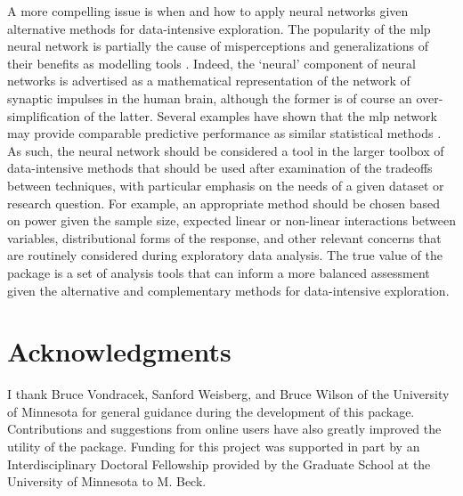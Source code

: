\documentclass[article,shortnames]{jss}\usepackage[]{graphicx}\usepackage[]{color}
\begin{document}
A more compelling issue is when and how to apply neural networks given alternative methods for data-intensive exploration.  The popularity of the \ac{mlp} neural network is partially the cause of misperceptions and generalizations of their benefits as modelling tools \citep{Burke97}. Indeed, the `neural' component of neural networks is advertised as a mathematical representation of the network of synaptic impulses in the human brain, although the former is of course an over-simplification of the latter.  Several examples have shown that the \ac{mlp} network may provide comparable predictive performance as similar statistical methods \citep{Feng02,Razi05,Beck14a}.  As such, the neural network should be considered a tool in the larger toolbox of data-intensive methods that should be used after examination of the tradeoffs between techniques, with particular emphasis on the needs of a given dataset or research question.  For example, an appropriate method should be chosen based on power given the sample size, expected linear or non-linear interactions between variables, distributional forms of the response, and other relevant concerns that are routinely considered during exploratory data analysis.  The true value of the  package is a set of analysis tools that can inform a more balanced assessment given the alternative and complementary methods for data-intensive exploration.

\section[Acknowledgments]{Acknowledgments}
 
I thank Bruce Vondracek, Sanford Weisberg, and Bruce Wilson of the University of Minnesota for general guidance during the development of this package.  Contributions and suggestions from online users have also greatly improved the utility of the package.  Funding for this project was supported in part by an Interdisciplinary Doctoral Fellowship provided by the Graduate School at the University of Minnesota to M. Beck.  



\end{document}
